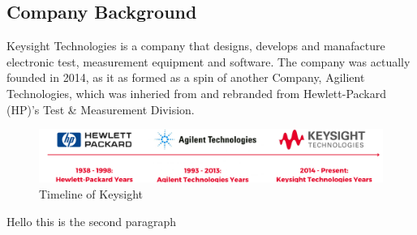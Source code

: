 \subsection{Company Background}



Keysight Technologies is a company that designs, develops and manafacture electronic test,
measurement  equipment and software. The company was actually founded in 2014, as it as formed as a spin of another Company,
Agilient Technologies, which was inheried from and rebranded from Hewlett-Packard (HP)'s Test \& Measurement Division.


\begin{figure}[H]
    
\centering
\includegraphics[width=\textwidth]{images/Keysight Timeline.png}
\caption{\label{fig1}Timeline of Keysight}
\end{figure}

Hello this is the second paragraph